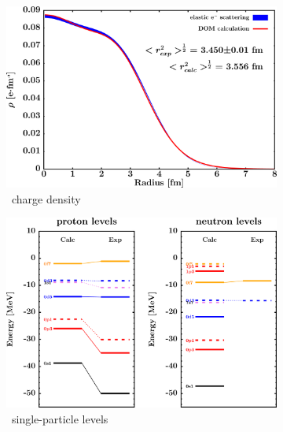 \begin{figure}[hbtp]
    \captionsetup[subfigure]{labelformat=empty}
    \centering
    \begin{subfigure}[b]{0.45\textwidth}
        \centering
        \includegraphics[width=\linewidth]{figures/ca40_chargeDensity.png}
        \caption{\caForty\ charge density}
        \label{DOMFitData_ca40_chargeDensity}
    \end{subfigure}\hspace{6pt}
    \begin{subfigure}[b]{0.45\textwidth}
        \centering
        \includegraphics[width=\linewidth]{figures/ca40_SPLevels.png}
        \caption{\caForty\ single-particle levels}
        \label{DOMFitData_ca40_SPLevels}
    \end{subfigure}\vspace{0.3in}
    \begin{subfigure}[b]{0.45\textwidth}

\end{subfigure}
\end{figure}
